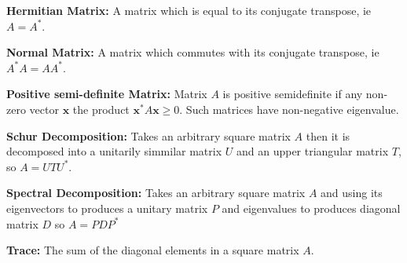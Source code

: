\begin{glossary}
    \textbf{Hermitian Matrix:} A matrix which is equal to its conjugate transpose, ie \(A = A^*\).
\end{glossary}

\begin{glossary}
    \textbf{Normal Matrix:} A matrix which commutes with its conjugate transpose, ie \(A^*A = AA^*\).
\end{glossary}

\begin{glossary}
    \textbf{Positive semi-definite Matrix:} Matrix \(A\) is positive semidefinite if any non-zero vector \(\textbf{x}\) 
    the product 
\(\textbf{x}^*A\textbf{x} \geq 0 \). Such matrices have non-negative eigenvalue.
\end{glossary}

\begin{glossary}
    \textbf{Schur Decomposition:} Takes an arbitrary square matrix \(A\) then it is decomposed into a unitarily simmilar matrix \(U\) and 
    an upper triangular matrix \(T\), so \(A = UTU^*\). 
\end{glossary}

\begin{glossary}
    \textbf{Spectral Decomposition:} Takes an arbitrary square matrix \(A\) and using its eigenvectors to produces a unitary matrix \(P\)
    and eigenvalues to produces diagonal matrix \(D\) so \(A = PDP^*\)
\end{glossary}

\begin{glossary}
    \textbf{Trace:} The sum of the diagonal elements in a square matrix \(A\).
\end{glossary}